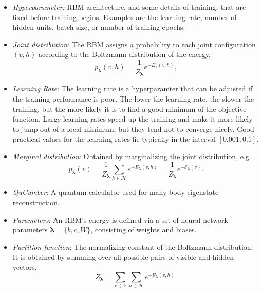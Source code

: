 \documentclass[submission, Phys]{SciPost}
\begin{document}
\begin{itemize}
	\item{\it Hyperparameter:} RBM architecture, and some details of training, that are fixed before training begins.  Examples are the learning rate, number of hidden units, batch size, or number of training epochs.

	\item {\it Joint distribution}: The RBM assigns a probability to each joint configuration $(v,h)$ according to the Boltzmann distribution of the energy,
	      \begin{equation}
		      p_{\bm{\lambda}}(v,h) = \frac{1}{Z_{\bm{\lambda}}} e^{-E_{\bm{\lambda}}(v,h)},
	      \end{equation}

\item{\it Learning Rate}: The learning rate is a hyperparamter that can be adjusted if the training performance is poor.
The lower the learning rate, the slower the training, but the more likely it is to find a good minimum of the objective function.
Large learning rates speed up the training and make it more likely to jump out of a local minimum, but they tend not to converge nicely.
Good practical values for the learning rates lie typically in the interval $[0.001, 0.1]$.


	\item {\it Marginal distribution}: Obtained by marginalizing the joint distribution, e.g.
	      \begin{equation}
		      \label{Eq:marginal_distribution}
		      p_{\bm{\lambda}}(v) = \frac{1}{Z_{\bm{\lambda}}} \sum\limits_{h\in \mathcal{H}} e^{-E_{\bm{\lambda}}(v,h)} = \frac{1}{Z_{\bm{\lambda}}} e^{- \mathcal{E}_{\bm{\lambda}}(v)}.
	      \end{equation}

	\item {\it QuCumber}: A quantum calculator used for many-body eigenstate reconstruction.

	\item {\it Parameters}: An RBM's energy is defined via a set of neural network parameters $\bm{\lambda} = \{b,c,W\}$, consisting of weights and biases.

	\item {\it Partition function}: The normalizing constant of the Boltzmann distribution. It is obtained by summing over all possible pairs of visible and hidden vectors,
	      \begin{equation}
		      Z_{\bm{\lambda}} = \sum\limits_{v\in \mathcal{V}}\sum\limits_{h\in \mathcal{H}} e^{-E_{\bm{\lambda}}(v,h)}.
	      \end{equation}


\end{itemize}
\end{document}
